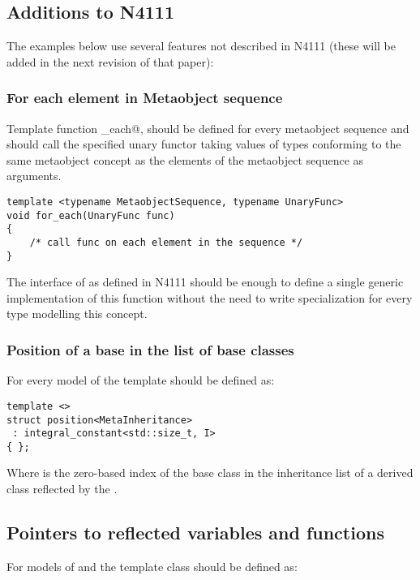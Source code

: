 \subsection{Additions to N4111}

The examples below use several features not described in N4111 (these will be added
in the next revision of that paper):

\subsubsection{For each element in Metaobject sequence}

Template function \verb@for_each@, should be defined for every metaobject sequence
and should call the specified unary functor taking values of types conforming to
the same metaobject concept as the elements of the metaobject sequence as arguments.

\begin{verbatim}
template <typename MetaobjectSequence, typename UnaryFunc>
void for_each(UnaryFunc func)
{
	/* call func on each element in the sequence */
}
\end{verbatim}

The interface of  as defined in N4111 should be enough
to define a single generic implementation of this function without the need
to write specialization for every type modelling this concept.

\subsubsection{Position of a base in the list of base classes}

For every model of  the \verb@position@ template should be defined as:

\begin{verbatim}
template <>
struct position<MetaInheritance>
 : integral_constant<std::size_t, I>
{ };
\end{verbatim}

Where \verb@I@ is the zero-based index of the base class in the inheritance list of a derived class
reflected by the .

\subsection{Pointers to reflected variables and functions}

For models of  and  the \verb@pointer@ template class
should be defined as:

